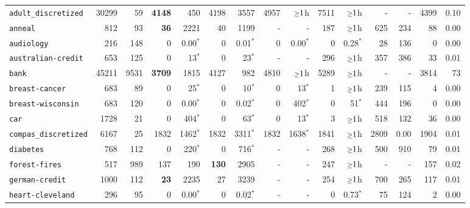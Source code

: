 \begin{tabular}{lccrrrrrrrrrrrr}
\texttt{adult\_discretized} & \multicolumn{1}{r}{30299} & \multicolumn{1}{r}{59}  & \textbf{4148} & 450 & 4198 & 3557 & 4957 & $\mathsmaller{\geq}1$h & 7511 & $\mathsmaller{\geq}1$h & - & - & 4399 & 0.10\\
\texttt{anneal} & \multicolumn{1}{r}{812} & \multicolumn{1}{r}{93}  & \textbf{36} & 2221 & 40 & 1199 & - & - & 187 & $\mathsmaller{\geq}1$h & 625 & 234 & 88 & 0.00\\
\texttt{audiology} & \multicolumn{1}{r}{216} & \multicolumn{1}{r}{148}  & 0 & 0.00$^*$ & 0 & 0.01$^*$ & 0 & 0.00$^*$ & 0 & 0.28$^*$ & 28 & 136 & 0 & 0.00\\
\texttt{australian-credit} & \multicolumn{1}{r}{653} & \multicolumn{1}{r}{125}  & 0 & 13$^*$ & 0 & 23$^*$ & - & - & 296 & $\mathsmaller{\geq}1$h & 357 & 386 & 33 & 0.01\\
\texttt{bank} & \multicolumn{1}{r}{45211} & \multicolumn{1}{r}{9531}  & \textbf{3709} & 1815 & 4127 & 982 & 4810 & $\mathsmaller{\geq}1$h & 5289 & $\mathsmaller{\geq}1$h & - & - & 3814 & 73\\
\texttt{breast-cancer} & \multicolumn{1}{r}{683} & \multicolumn{1}{r}{89}  & 0 & 25$^*$ & 0 & 10$^*$ & 0 & 13$^*$ & 1 & $\mathsmaller{\geq}1$h & 239 & 115 & 4 & 0.00\\
\texttt{breast-wisconsin} & \multicolumn{1}{r}{683} & \multicolumn{1}{r}{120}  & 0 & 0.00$^*$ & 0 & 0.02$^*$ & 0 & 402$^*$ & 0 & 51$^*$ & 444 & 196 & 0 & 0.00\\
\texttt{car} & \multicolumn{1}{r}{1728} & \multicolumn{1}{r}{21}  & 0 & 404$^*$ & 0 & 63$^*$ & 0 & 13$^*$ & 3 & $\mathsmaller{\geq}1$h & 518 & 132 & 36 & 0.00\\
\texttt{compas\_discretized} & \multicolumn{1}{r}{6167} & \multicolumn{1}{r}{25}  & 1832 & 1462$^*$ & 1832 & 3311$^*$ & 1832 & 1638$^*$ & 1841 & $\mathsmaller{\geq}1$h & 2809 & 0.00 & 1904 & 0.01\\
\texttt{diabetes} & \multicolumn{1}{r}{768} & \multicolumn{1}{r}{112}  & 0 & 220$^*$ & 0 & 716$^*$ & - & - & 268 & $\mathsmaller{\geq}1$h & 500 & 910 & 79 & 0.01\\
\texttt{forest-fires} & \multicolumn{1}{r}{517} & \multicolumn{1}{r}{989}  & 137 & 190 & \textbf{130} & 2905 & - & - & 247 & $\mathsmaller{\geq}1$h & - & - & 157 & 0.02\\
\texttt{german-credit} & \multicolumn{1}{r}{1000} & \multicolumn{1}{r}{112}  & \textbf{23} & 2235 & 27 & 3239 & - & - & 254 & $\mathsmaller{\geq}1$h & 700 & 265 & 117 & 0.01\\
\texttt{heart-cleveland} & \multicolumn{1}{r}{296} & \multicolumn{1}{r}{95}  & 0 & 0.00$^*$ & 0 & 0.02$^*$ & - & - & 0 & 0.73$^*$ & 75 & 124 & 2 & 0.00\\

\end{tabular}
